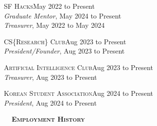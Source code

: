 \documentclass[hidelinks, 10pt]{article}
\def\contentspacing{2.5mm}          %
\def\sectionspacing{6mm}            %
\renewcommand{\section}[1]{
    {\fontsize{14}{14}\selectfont \textsc{\textbf{\ \ #1\ \ }}}\hrulefill
}
\begin{document}
{\vspace{\contentspacing}

\begin{minipage}[ct]{0.9\linewidth}
    \textsc{SF Hacks}\hfill May 2022 to Present\\
    \emph{Graduate Mentor}, May 2024 to Present\\
    \emph{Treasurer}, May 2022 to May 2024
\end{minipage}

\vspace{\contentspacing}

\begin{minipage}[ct]{0.9\linewidth}
    \textsc{CS}\{\textsc{Research}\}\textsc{ Club}\hfill Aug 2023 to Present\\
    \emph{President/Founder}, Aug 2023 to Present
\end{minipage}

\vspace{\contentspacing}


\begin{minipage}[ct]{0.9\linewidth}
    \textsc{Artificial Intelligence Club}\hfill Aug 2023 to Present\\
    \emph{Treasurer}, Aug 2023 to Present
\end{minipage}

\vspace{\contentspacing}

\begin{minipage}[ct]{0.9\linewidth}
    \textsc{Korean Student Association}\hfill Aug 2024 to Present\\
    \emph{President}, Aug 2024 to Present
\end{minipage}

\vspace{\sectionspacing}

\section{Employment History}

}
\end{document}
